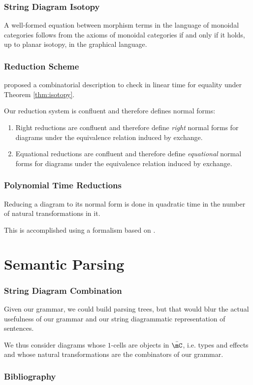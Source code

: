\documentclass[math, english, info]{beamercours}
\begin{document}
\begin{frame}
	\frametitle{String Diagram Isotopy}
	\begin{thm}
		\label{thm:isotopy}
		A well-formed equation between morphism terms in the language of monoidal categories follows from the axioms of monoidal categories if and only if it holds, up to planar isotopy, in the graphical language.
	\end{thm}
\end{frame}

\begin{frame}
	\frametitle{Reduction Scheme}
	\cite{delpeuchNormalizationPlanarString2022} proposed a combinatorial description to check
	in linear time for equality under Theorem \ref{thm:isotopy}.

	\pause\smallskip

	\begin{thm}[Confluence]\label{thm:confluence}
		Our reduction system is confluent and therefore defines normal forms:
		\begin{enumerate}
			\item Right reductions are confluent and therefore define \emph{right} normal forms for
			      diagrams under the equivalence relation induced by exchange.
			\item Equational reductions are confluent and therefore define \emph{equational}
			      normal forms for diagrams under the equivalence relation induced by exchange.
		\end{enumerate}
	\end{thm}
\end{frame}

\begin{frame}
	\frametitle{Polynomial Time Reductions}
	\begin{thm}
		\label{thm:normalize}
		Reducing a diagram to its normal form is done in quadratic time in
		the number of natural transformations in it.
	\end{thm}
	This is accomplished using a formalism based on \cite{delpeuchNormalizationPlanarString2022}.
\end{frame}

\section{Semantic Parsing}

\begin{frame}
	\frametitle{String Diagram Combination}
	Given our grammar, we could build parsing trees, but that would blur the actual usefulness of our grammar and our string diagrammatic representation of sentences.

	\medskip

	We thus consider diagrams whose $1$-cells are objects in $\bar{\mC}$, i.e. types and effects and whose natural transformations are the combinators of our grammar.
\end{frame}


\appendix
\begin{frame}[allowframebreaks]
	\frametitle{Bibliography}
	\printbibliography{}
\end{frame}
\end{document}
